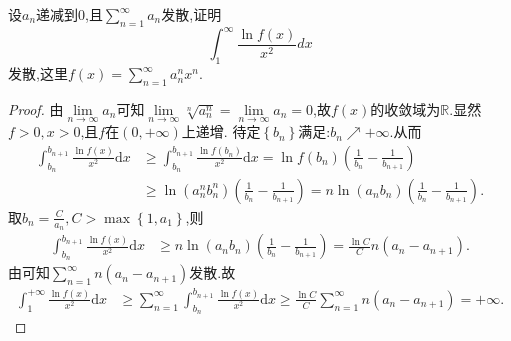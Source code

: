 \documentclass[../../main.tex]{subfiles}
\begin{document}
\begin{example}
设$a_n$递减到$0$,且$\sum\limits_{n=1}^\infty a_n$发散,证明
$$\int_1^\infty \frac{\ln f(x)}{x^2}dx$$
发散,这里$f(x)=\sum\limits_{n=1}^\infty a_n^n x^n$.
\end{example}
\begin{proof}
由$\lim\limits_{n\rightarrow \infty}a_n$可知$\lim\limits_{n\rightarrow \infty}\sqrt[n]{a_{n}^{n}}=\lim\limits_{n\rightarrow \infty}a_n=0$,故$f\left( x \right)$的收敛域为$\mathbb{R}$.显然$f>0,x>0$,且$f$在$\left( 0,+\infty \right)$上递增.
待定$\left\{ b_n \right\}$满足:$b_n\nearrow +\infty$.从而
\begin{align*}
\int_{b_n}^{b_{n+1}}{\frac{\ln f\left( x \right)}{x^2}\mathrm{d}x}&\geqslant \int_{b_n}^{b_{n+1}}{\frac{\ln f\left( b_n \right)}{x^2}\mathrm{d}x}=\ln f\left( b_n \right) \left( \frac{1}{b_n}-\frac{1}{b_{n+1}} \right) \\
&\geqslant \ln \left( a_{n}^{n}b_{n}^{n} \right) \left( \frac{1}{b_n}-\frac{1}{b_{n+1}} \right) =n\ln \left( a_nb_n \right) \left( \frac{1}{b_n}-\frac{1}{b_{n+1}} \right) .
\end{align*}
取$b_n=\frac{C}{a_n},C>\max \left\{ 1,a_1 \right\}$,则
\begin{align*}
\int_{b_n}^{b_{n+1}}{\frac{\ln f\left( x \right)}{x^2}\mathrm{d}x}&\geqslant n\ln \left( a_nb_n \right) \left( \frac{1}{b_n}-\frac{1}{b_{n+1}} \right) =\frac{\ln C}{C}n\left( a_n-a_{n+1} \right) .
\end{align*}
由可知$\sum_{n=1}^{\infty}{n\left( a_n-a_{n+1} \right)}$发散.故
\begin{align*}
\int_1^{+\infty}{\frac{\ln f\left( x \right)}{x^2}\mathrm{d}x}&\geqslant \sum_{n=1}^{\infty}{\int_{b_n}^{b_{n+1}}{\frac{\ln f\left( x \right)}{x^2}\mathrm{d}x}}\geqslant \frac{\ln C}{C}\sum_{n=1}^{\infty}{n\left( a_n-a_{n+1} \right)}=+\infty .
\end{align*}
\end{proof}
\end{document}
